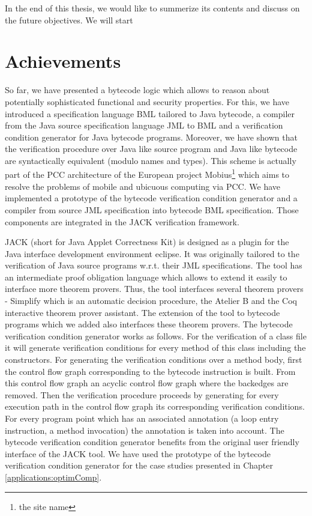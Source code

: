 
In the end of this thesis, we would like to summerize 
its contents and discuss on the future objectives. We will start  
\section{Achievements}
So far, we have  presented a bytecode logic which allows to reason about potentially
sophisticated  functional and security properties.
 For this, we have 
introduced a specification language BML tailored to Java bytecode, a compiler
from the Java source specification language JML to BML and a verification 
condition generator for Java bytecode programs. Moreover, we have
shown that the verification procedure over Java like source program
and Java like bytecode are syntactically equivalent (modulo names and types). 
This scheme is actually part of the PCC architecture of the
European project Mobius\footnote{the site name} which aims to resolve the problems
of mobile and ubicuous computing via PCC. 
We have implemented a prototype of the bytecode verification condition generator and a compiler 
from source JML specification into bytecode BML specification. Those components are integrated in the JACK verification framework. 

JACK (short for Java Applet Correctness Kit) is designed as a plugin for the Java interface development
 environment eclipse. 
 It was originally tailored to the verification of Java source programs 
w.r.t. their JML specifications. The tool has an intermediate proof obligation language which allows to extend it easily to interface more 
 theorem provers. Thus, the tool interfaces several theorem provers - Simplify \cite{Simpl05DNS} which is an automatic decision procedure, 
the Atelier B and the Coq interactive
theorem prover assistant. The extension of the tool to bytecode programs which we added also interfaces these theorem provers. The bytecode 
verification condition generator works as follows. For the verification of a class file it will generate verification conditions for every
 method of this class including the constructors. For generating the verification conditions over a method body, first the control flow
 graph corresponding to the bytecode instruction is built. From this control flow graph an acyclic control flow graph where the backedges are 
removed.
 Then the verification procedure proceeds by generating for every execution path in the control flow graph its corresponding verification conditions.
For every program point which has an associated annotation (a loop entry instruction, a method invocation) the annotation is taken into account. 
The bytecode verification condition generator benefits from the original user friendly interface of the JACK tool. 
We have used the prototype of the bytecode verification condition generator for the case studies presented in Chapter \ref{applications:optimComp}.


